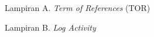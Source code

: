 
\noindent Lampiran A. \textit{Term of References} (TOR) \dotfill \pageref{app:tor}\par
\noindent Lampiran B. \textit{Log Activity} \dotfill \pageref{app:log}\par
